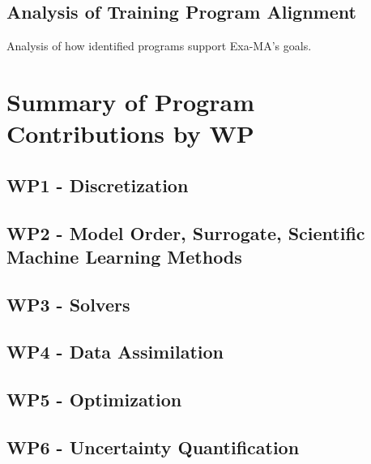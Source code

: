 \subsection{Analysis of Training Program Alignment}
Analysis of how identified programs support Exa-MA's goals.

\section{Summary of Program Contributions by WP}
\subsection{WP1 - Discretization}
\subsection{WP2 - Model Order, Surrogate, Scientific Machine Learning Methods}
\subsection{WP3 - Solvers}
\subsection{WP4 - Data Assimilation}
\subsection{WP5 - Optimization}
\subsection{WP6 - Uncertainty Quantification}

\